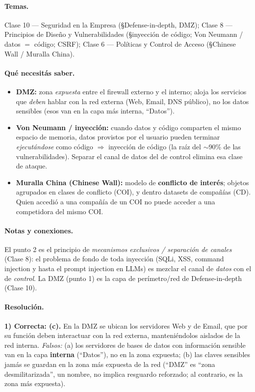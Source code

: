 \paragraph{Temas.} Clase 10 — Seguridad en la Empresa (\S Defense-in-depth, DMZ);
Clase 8 — Principios de Diseño y Vulnerabilidades (\S inyección de código; Von Neumann /
datos $=$ código; CSRF); Clase 6 — Políticas y Control de Acceso (\S Chinese Wall / Muralla
China).

\paragraph{Qué necesitás saber.}
\begin{itemize}[leftmargin=1.4em,itemsep=2pt]
  \item \textbf{DMZ:} zona \emph{expuesta} entre el firewall externo y el interno; aloja los
        servicios que \emph{deben} hablar con la red externa (Web, Email, DNS público), no los
        datos sensibles (esos van en la capa más interna, ``Datos'').
  \item \textbf{Von Neumann / inyección:} cuando datos y código comparten el mismo espacio de
        memoria, datos provistos por el usuario pueden terminar \emph{ejecutándose} como código
        $\Rightarrow$ inyección de código (la raíz del $\sim$90\% de las vulnerabilidades).
        Separar el canal de datos del de control elimina esa clase de ataque.
  \item \textbf{Muralla China (Chinese Wall):} modelo de \textbf{conflicto de interés}; objetos
        agrupados en clases de conflicto (COI), y dentro datasets de compañías (CD). Quien
        accedió a una compañía de un COI no puede acceder a una competidora del mismo COI.
\end{itemize}

\paragraph{Notas y conexiones.} El punto 2 es el principio de \emph{mecanismos exclusivos /
separación de canales} (Clase 8): el problema de fondo de toda inyección (SQLi, XSS, command
injection y hasta el prompt injection en LLMs) es mezclar el canal de \emph{datos} con el de
\emph{control}. La DMZ (punto 1) es la capa de perímetro/red de Defense-in-depth (Clase 10).

\paragraph{Resolución.}
\textbf{1) Correcta: (c).} En la DMZ se ubican los servidores Web y de Email, que por su función
deben interactuar con la red externa, manteniéndolos aislados de la red interna. \emph{Falsos:}
(a) los servidores de bases de datos con información sensible van en la capa \textbf{interna}
(``Datos''), no en la zona expuesta; (b) las claves sensibles jamás se guardan en la zona más
expuesta de la red (``DMZ'' es ``zona desmilitarizada'', un nombre, no implica resguardo
reforzado; al contrario, es la zona más expuesta).

